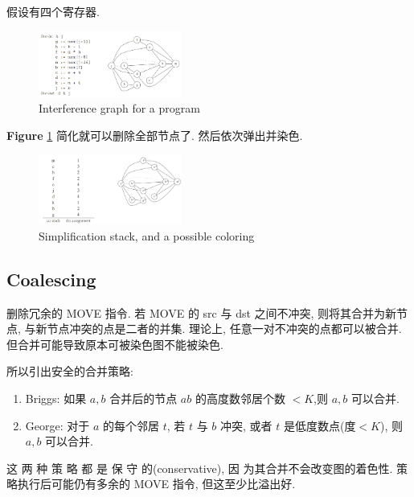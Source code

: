 \begin{example}
    假设有四个寄存器. 

    \begin{figure}[!htb]
        \centering
        \includegraphics[width=0.42\textwidth]{pic/CP11/Interference graph for a program}
        \caption{Interference graph for a program}
        \label{fig:Interference-graph}
    \end{figure}
    
    \textbf{Figure} \ref{fig:Interference-graph} 简化就可以删除全部节点了. 然后依次弹出并染色. 

    \begin{figure}[!htb]
        \centering
        \includegraphics[width=0.42\textwidth]{pic/CP11/Simplification stack, and a possible coloring}
        \caption{Simplification stack, and a possible coloring}
    \end{figure}
    
    
\end{example}

\subsection{Coalescing}
删除冗余的 MOVE 指令. 若 MOVE 的 src 与 dst 之间不冲突, 则将其合并为新节点, 与新节点冲突的点是二者的并集. 理论上, 任意一对不冲突的点都可以被合并. 但合并可能导致原本可被染色图不能被染色. 

所以引出安全的合并策略:
\begin{enumerate}
    \item Briggs: 如果 $a,b$ 合并后的节点 $ab$ 的高度数邻居个数 $<K$,则 $a, b$ 可以合并.
    \item George: 对于 $a$ 的每个邻居 $t$, 若 $t$ 与 $b$ 冲突, 或者 $t$ 是低度数点(度$<K$), 则 $a,b$ 可以合并. 
\end{enumerate}

这 两 种 策 略 都 是 保 守 的(conservative), 因 为其合并不会改变图的着色性. 策略执行后可能仍有多余的 MOVE 指令, 但这至少比溢出好.


